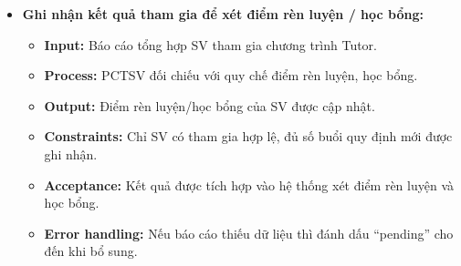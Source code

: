 \begin{itemize}
    \item \textbf{Ghi nhận kết quả tham gia để xét điểm rèn luyện / học bổng:}
    \begin{itemize}
        \item \textbf{Input:} Báo cáo tổng hợp SV tham gia chương trình Tutor.
        \item \textbf{Process:} PCTSV đối chiếu với quy chế điểm rèn luyện, học bổng.
        \item \textbf{Output:} Điểm rèn luyện/học bổng của SV được cập nhật.
        \item \textbf{Constraints:} Chỉ SV có tham gia hợp lệ, đủ số buổi quy định mới được ghi nhận.
        \item \textbf{Acceptance:} Kết quả được tích hợp vào hệ thống xét điểm rèn luyện và học bổng.
        \item \textbf{Error handling:} Nếu báo cáo thiếu dữ liệu thì đánh dấu “pending” cho đến khi bổ sung.
    \end{itemize}
\end{itemize}


